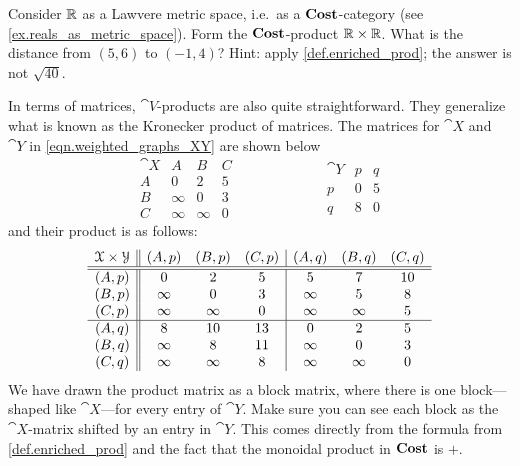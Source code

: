 \documentclass[7Sketches]{subfiles}
\begin{document}
\begin{exercise}%
\label{exc.not_sqrt40}
Consider $\mathbb{R}$ as a Lawvere metric space, i.e.\ as a $\mathbf{Cost}$-category (see \cref{ex.reals_as_metric_space}). Form the $\mathbf{Cost}$-product $\mathbb{R}\times\mathbb{R}$. What is the distance from $(5,6)$ to $(-1,4)$? Hint: apply \cref{def.enriched_prod}; the answer is not $\sqrt{40}$.
\end{exercise}

In terms of matrices, $\cat{V}$-products are also quite straightforward. They generalize what is known as the Kronecker product of matrices. The matrices for $\cat{X}$ and $\cat{Y}$ in \cref{eqn.weighted_graphs_XY} are shown below
\[
\begin{array}{c|ccc}
  \cat{X}&A&B&C\\\hline
  A & 0 & 2 & 5\\
  B & \infty  & 0 & 3\\
  C & \infty & \infty & 0
\end{array}
\hspace{1in}
\begin{array}{c|cc}
  \cat{Y}&p&q\\\hline
  p & 0 & 5\\
  q & 8 & 0
\end{array}
\]
and their product is as follows:
\[
\begin{array}{c||ccc| ccc}
	\mathcal{X}\times\mathcal{Y}&(A,p)&(B,p)&(C,p)&(A,q)&(B,q)&(C,q)\\\hline\hline
	(A,p)& 0 & 2 & 5 & 5&7&10\\
	(B,p)& \infty & 0 & 3 & \infty & 5 & 8\\
	(C,p)& \infty &\infty & 0& \infty&\infty &5\\\hline
	(A,q)& 8 & 10 & 13 & 0 & 2 & 5\\
	(B,q)& \infty & 8 & 11 & \infty & 0 & 3\\
	(C,q)& \infty & \infty & 8 & \infty &\infty & 0
\end{array}
\]
We have drawn the product matrix as a block matrix, where there is one block---shaped like $\cat{X}$---for every entry of $\cat{Y}$. Make sure you can see each block as the $\cat{X}$-matrix shifted by an entry in $\cat{Y}$. This comes directly from the formula from \cref{def.enriched_prod} and the fact that the monoidal product in $\mathbf{Cost}$ is $+$.
\end{document}
